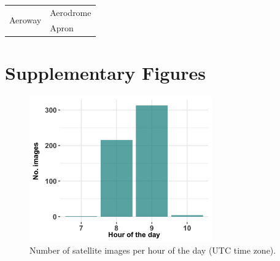 \documentclass[sn-basic]{sn-jnl}%
\begin{document}
{\begin{appendices}
\begin{table}
\begin{tabular}{ll}
    \multirow{2}{*}{Aeroway}         & Aerodrome                          
                               \\
                               & Apron                              
                               \\ \bottomrule
\end{tabular}
\end{table}















\clearpage
\section{Supplementary Figures}\label{SuppMat_figs}

\begin{figure}[htbp]
\begin{center}
\includegraphics[width=0.70\textwidth]{Figures/hour_of_day.jpg}
\end{center}
\caption{Number of satellite images per hour of the day (UTC time zone).}
\label{figSM_Nimages_per_hour}
\end{figure}



\end{appendices}}
\end{document}
